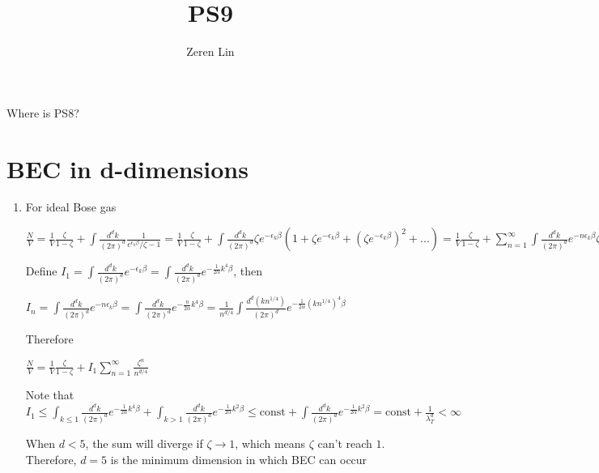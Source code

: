 \documentclass{article}
\title{PS9}
\begin{document}
      \author{ Zeren Lin  }
    
    \maketitle
    
    

    
    Where is PS8?

    \section{BEC in d-dimensions}\label{bec-in-d-dimensions}

    \begin{enumerate}
\def\labelenumi{(\alph{enumi})}
\itemsep1pt\parskip0pt
\item
  For ideal Bose gas


$\frac{N}{V} = \frac{1}{V}\frac{\zeta}{1-\zeta}+ \int \frac{d^dk}{(2 \pi)^d} \frac{1}{e^{\epsilon_k \beta}/\zeta-1}=\frac{1}{V}\frac{\zeta}{1-\zeta}+  \int \frac{d^dk}{(2 \pi)^d}\zeta e^{-\epsilon_k \beta}(1+\zeta e^{-\epsilon_k \beta}+ (\zeta e^{-\epsilon_k \beta})^2 + ...) =\frac{1}{V} \frac{\zeta}{1-\zeta}+\sum_{n=1}^{\infty} \int \frac{d^dk}{(2 \pi)^d} e^{-n\epsilon_k \beta}\zeta^n$

Define $ I_1 = \int \frac{d^dk}{(2 \pi)^d} e^{-\epsilon_k \beta} = \int \frac{d^dk}{(2 \pi)^d} e^{-\frac{1}{2 \alpha} k^4 \beta}$, then

$I_n = \int \frac{d^dk}{(2 \pi)^d} e^{-n\epsilon_k \beta} = \int \frac{d^dk}{(2 \pi)^d} e^{-\frac{n}{2 \alpha} k^4 \beta} =\frac{1}{n^{d/4}}\int \frac{d^d(kn^{1/4})}{(2 \pi)^d} e^{-\frac{1}{2 \alpha} {(k n^{1/4})}^4 \beta} $

Therefore

$\frac{N}{V} =\frac{1}{V}\frac{\zeta}{1-\zeta}+ I_1\sum_{n=1}^{\infty}\frac{\zeta^n}{n^{d/4}}$

Note that
$I_1 \le \int_{k \le 1} \frac{d^dk}{(2 \pi)^d} e^{-\frac{1}{2 \alpha} k^4 \beta}+\int_{k>1} \frac{d^dk}{(2 \pi)^d} e^{-\frac{1}{2 \alpha} k^2 \beta} \le \mbox{const} + \int \frac{d^dk}{(2 \pi)^d} e^{-\frac{1}{2 \alpha} k^2 \beta} = \mbox{const} + \frac{1}{\lambda_T^d} < \infty$

When $d<5$, the sum will diverge if $\zeta \rightarrow1$, which means
$\zeta$ can't reach $1$. Therefore, $d=5$ is the minimum dimension in
which BEC can occur
\end{enumerate}
\end{document}
